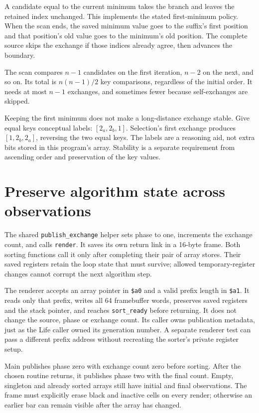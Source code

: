 A candidate equal to the current minimum takes the branch and leaves the retained
index unchanged. This implements the stated first-minimum policy. When the scan
ends, the saved minimum value goes to the suffix's first position and that
position's old value goes to the minimum's old position. The complete source
skips the exchange if those indices already agree, then advances the boundary.

The scan compares $n-1$ candidates on the first iteration, $n-2$ on the next, and
so on. Its total is $n(n-1)/2$ key comparisons, regardless of the initial order.
It needs at most $n-1$ exchanges, and sometimes fewer because self-exchanges are
skipped.

Keeping the first minimum does not make a long-distance exchange stable. Give
equal keys conceptual labels: $[2_a,2_b,1]$. Selection's first exchange produces
$[1,2_b,2_a]$, reversing the two equal keys. The labels are a reasoning aid, not
extra bits stored in this program's array. Stability is a separate requirement
from ascending order and preservation of the key values.

\section{Preserve algorithm state across observations}

The shared \texttt{publish\_exchange} helper sets phase to one, increments the
exchange count, and calls \texttt{render}. It saves its own return link in a
16-byte frame. Both sorting functions call it only after completing their pair
of array stores. Their saved registers retain the loop state that must survive;
allowed temporary-register changes cannot corrupt the next algorithm step.

The renderer accepts an array pointer in \texttt{\$a0} and a valid prefix length
in \texttt{\$a1}. It reads only that prefix, writes all 64 framebuffer words,
preserves saved registers and the stack pointer, and reaches \texttt{sort\_ready}
before returning. It does not change the source, phase or exchange count. Its
caller owns publication metadata, just as the Life caller owned its generation
number. A separate renderer test can pass a different prefix address without
recreating the sorter's private register setup.

Main publishes phase zero with exchange count zero before sorting. After the
chosen routine returns, it publishes phase two with the final count. Empty,
singleton and already sorted arrays still have initial and final observations.
The frame must explicitly erase black and inactive cells on every render; otherwise
an earlier bar can remain visible after the array has changed.


